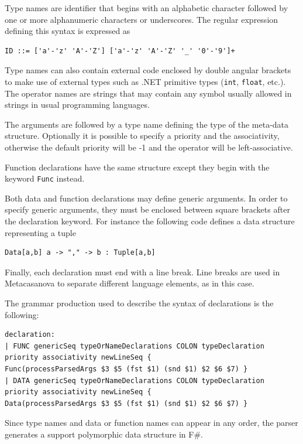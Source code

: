 Type names are identifier that begins with an alphabetic character followed by one or more alphanumeric characters or underscores. The regular expression defining this syntax is expressed as

\begin{lstlisting}
ID ::= ['a'-'z' 'A'-'Z'] ['a'-'z' 'A'-'Z' '_' '0'-'9']+
\end{lstlisting}

Type names can also contain external code enclosed by double angular brackets to make use of external types such as .NET primitive types (\texttt{int}, \texttt{float}, etc.). The operator names are strings that may contain any symbol usually allowed in strings in usual programming languages.

The arguments are followed by a type name defining the type of the meta-data structure. Optionally it is possible to specify a priority and the associativity, otherwise the default priority will be -1 and the operator will be left-associative.

Function declarations have the same structure except they begin with the keyword \texttt{Func} instead.

Both data and function declarations may define generic arguments. In order to specify generic arguments, they must be enclosed between square brackets after the declaration keyword. For instance the following code defines a data structure representing a tuple

\begin{lstlisting}
Data[a,b] a -> "," -> b : Tuple[a,b]
\end{lstlisting}

Finally, each declaration must end with a line break. Line breaks are used in Metacasanova to separate different language elements, as in this case.

The grammar production used to describe the syntax of declarations is the following:

\begin{lstlisting}
declaration:
| FUNC genericSeq typeOrNameDeclarations COLON typeDeclaration priority associativity newLineSeq {
Func(processParsedArgs $3 $5 (fst $1) (snd $1) $2 $6 $7) }
| DATA genericSeq typeOrNameDeclarations COLON typeDeclaration priority associativity newLineSeq {
Data(processParsedArgs $3 $5 (fst $1) (snd $1) $2 $6 $7) }
\end{lstlisting}

Since type names and data or function names can appear in any order, the parser generates a support polymorphic data structure in F\#.

